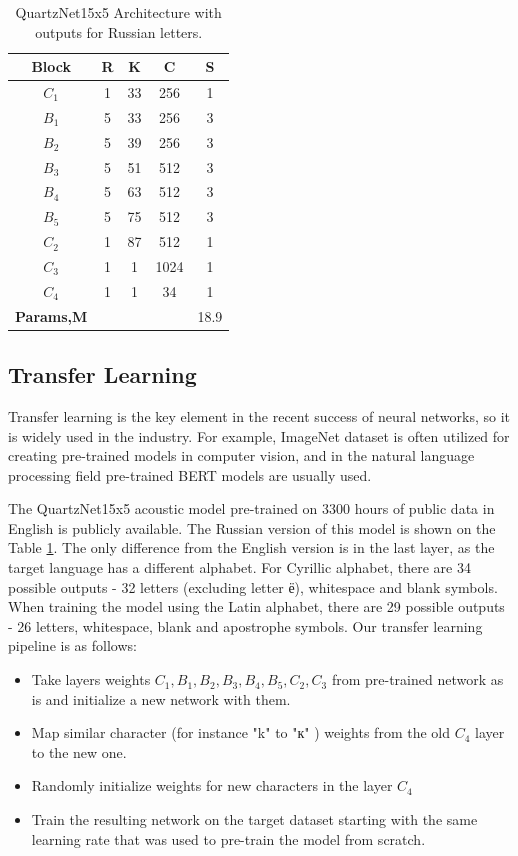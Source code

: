 \documentclass[a4paper]{article}
\begin{document}
\begin{table}[t]
  \caption{QuartzNet15x5 Architecture with outputs for Russian letters. }
  \label{tabular:Quartznet}
  \centering
  \begin{tabular}{ccccc}
    \toprule
    \textbf{Block}  & \textbf{R} & \textbf{K} & \textbf{C} & \textbf{S}     \\
    \midrule
    $C_1$  & 1 & 33 & 256 &  1  \\
    \midrule
    $B_1$  & 5 & 33 & 256 &  3  \\
    $B_2$  & 5 & 39 & 256 &  3  \\
    $B_3$  & 5 & 51 & 512 &  3  \\
    $B_4$  & 5 & 63 & 512 &  3  \\
    $B_5$  & 5 & 75 & 512 &  3  \\
    \midrule
    $C_2$  & 1 & 87 & 512 &  1  \\
    $C_3$  & 1 & 1 & 1024 &  1  \\
    $C_4$  & 1 & 1 & 34 &  1    \\
    \bottomrule
    \textbf{Params,M}  &  &  & &  18.9     \\
  \end{tabular}
\end{table}


\subsection{Transfer Learning}

Transfer learning is the key element in the recent success of neural networks, so it is widely used in the industry. For example, ImageNet dataset is often utilized for creating pre-trained models in computer vision, and in the natural language processing field pre-trained BERT models are usually used. 

The QuartzNet15x5 acoustic model pre-trained on 3300 hours of public data in English is publicly available. The Russian version of this model is shown on the Table \ref{tabular:Quartznet}. The only difference from the English version is in the last layer, as the target language has a different alphabet. For Cyrillic alphabet, there are 34 possible outputs - 32 letters (excluding letter ё), whitespace and blank symbols. When training the model using the Latin alphabet, there are 29 possible outputs - 26 letters, whitespace, blank and apostrophe symbols. Our transfer learning pipeline is as follows:
\begin{itemize}
    \item Take layers weights $C_1, B_1, B_2, B_3, B_4, B_5, C_2, C_3$ from pre-trained network as is and initialize a new network with them.
    \item Map similar character (for instance "k"  to "к" ) weights from the old $C_4$ layer to the new one.
    \item Randomly initialize weights for new characters in the layer $C_4$
    \item Train the resulting network on the target dataset starting with the same learning rate that was used to pre-train the model from scratch.
\end{itemize}
\end{document}
